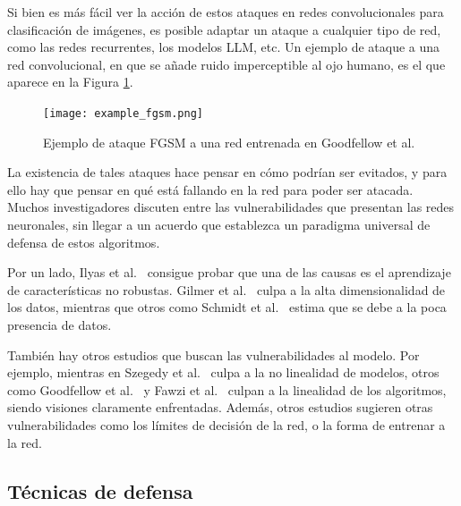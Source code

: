 Si bien es más fácil ver la acción de estos ataques en redes convolucionales para clasificación de imágenes, es posible  adaptar un ataque a cualquier tipo de red, como las redes recurrentes, los modelos LLM, etc. Un ejemplo de ataque a una red convolucional, en que se añade ruido imperceptible al ojo humano, es el que aparece en la Figura \ref{fig:example_fgsm}.

\begin{figure}[h]
    \centering
    \texttt{[image: example\_fgsm.png]}
    \caption{Ejemplo de ataque FGSM a una red entrenada en Goodfellow et al.~\cite{GoodfLAdvers}}
    \label{fig:example_fgsm}
\end{figure}


La existencia de tales ataques hace pensar en cómo podrían ser evitados, y para ello hay que pensar en qué está fallando en la red para poder ser atacada. Muchos investigadores discuten entre las vulnerabilidades que presentan las redes neuronales, sin llegar a un acuerdo que establezca un paradigma universal de defensa de estos algoritmos.

Por un lado, Ilyas et al.~\cite{NoRobustFeatures} consigue probar que una de las causas es el aprendizaje de características no robustas. Gilmer et al.~\cite{RelatDimensAdvEx} culpa a la alta dimensionalidad de los datos, mientras que otros como Schmidt et al.~\cite{RequiresDataLudwig} estima que se debe a la poca presencia de datos.

También hay otros estudios que buscan las vulnerabilidades al modelo. Por ejemplo, mientras en Szegedy et al.~\cite{DataManifold} culpa a la no linealidad de modelos, otros como Goodfellow et al.~\cite{GoodfLAdvers} y Fawzi et al.~\cite{FundLimits} culpan a la linealidad de los algoritmos, siendo visiones claramente enfrentadas. Además, otros estudios sugieren otras vulnerabilidades como los límites de decisión de la red, o la forma de entrenar a la red.

\subsection{Técnicas de defensa}

